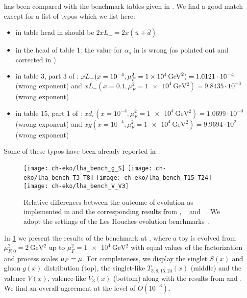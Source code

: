\eko{} has been compared with the benchmark tables
given in \cite{Giele:2002hx,Dittmar:2005ed}.
We find a good match except for a list of typos which we list here:
\begin{itemize}
    \item in table head in \cite{Giele:2002hx} should be $2xL_+ = 2x(\bar u + \bar d)$
    \item in the head of table 1: the value for $\alpha_s$ in \ffns{} is wrong (as pointed out and corrected in \cite{Dittmar:2005ed})
    \item in table 3, part 3 of \cite{Giele:2002hx}: $xL_-(x=10^{-4}, \muF^2 = \SI{1e4}{\GeV^2})=1.0121\cdot 10^{-4}$ (wrong exponent) and
          $xL_-(x=0.1, \mu_F^2 = \SI{1e4}{\GeV^2})=9.8435\cdot 10^{-3}$ (wrong exponent)
    \item in table 15, part 1 of \cite{Dittmar:2005ed}: $xd_v(x=10^{-4}, \mu_F^2 = \SI{1e4}{\GeV^2}) = 1.0699\cdot 10^{-4}$ (wrong exponent) and
          $xg(x=10^{-4}, \mu_F^2 = \SI{1e4}{\GeV^2}) = 9.9694\cdot 10^{2}$ (wrong exponent)
\end{itemize}
Some of these typos have been already reported in \cite{Diehl:2021gvs}.

\begin{figure}
    \centering
    \texttt{[image: ch-eko/lha\_bench\_g\_S]}
    \texttt{[image: ch-eko/lha\_bench\_T3\_T8]}
    \texttt{[image: ch-eko/lha\_bench\_T15\_T24]}
    \texttt{[image: ch-eko/lha\_bench\_V\_V3]}
    \caption{Relative differences between 
        the outcome of \nnlo{} \qcd{} evolution
        as implemented in \eko{} and the
        corresponding results from \cite{Dittmar:2005ed}, \apfel{}~\cite{Bertone:2013vaa} and \pegasus{}~\cite{Vogt:2004ns}.
        We adopt the settings of the Les Houches \pdf{} evolution benchmarks~\cite{Giele:2002hx,Dittmar:2005ed}.}
    \label{fig:eko/LHAbench}
\end{figure}

In \cref{fig:eko/LHAbench} we present the results of the \vfns{} benchmark at
\nnlo{}, where a toy \pdf{} is evolved from $\mu_{F,0}^2=\SI{2}{\GeV^2}$ up to
$\mu_{F}^2=\SI{1e4}{\GeV^2}$ with equal values of the factorization and process
scales $\mu_F=\mu$.
For completeness, we display the singlet $S(x)$ and gluon $g(x)$ distribution
(top), the singlet-like $T_{3,8,15,24}(x)$ (middle) and the valence $V(x)$,
valence-like $V_{3}(x)$ (bottom) along with the results from \apfel{} and
\pegasus{}. We find an overall agreement at the level of $O(10^{-3})$.
